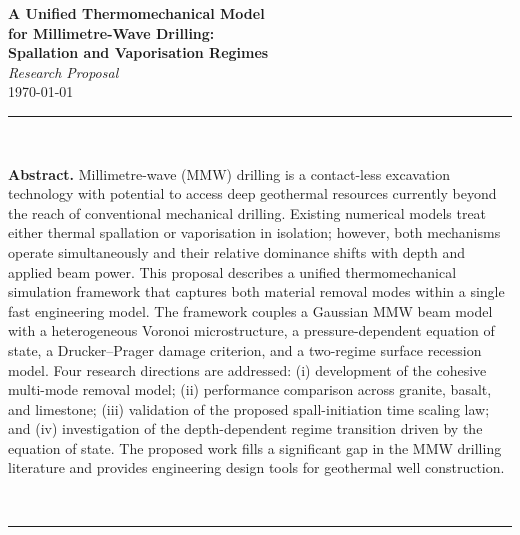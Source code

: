 \documentclass[12pt, a4paper]{article}
\begin{document}
\begin{titlepage}
\begin{center}
    \vspace*{1.5cm}
    {\Huge\bfseries\color{darkblue}
        A Unified Thermomechanical Model\\[8pt]
        for Millimetre-Wave Drilling:\\[8pt]
        Spallation and Vaporisation Regimes}\\[1.5cm]

    {\large\color{darkblue!70}\textit{Research Proposal}}\\[0.6cm]
    {\normalsize\color{black!70} \today}\\[2cm]

    \noindent\color{midblue}\rule{0.85\linewidth}{0.8pt}\\[0.4cm]
    \begin{minipage}{0.85\linewidth}
    \footnotesize\color{black!70}
    \textbf{Abstract.}
    Millimetre-wave (MMW) drilling is a contact-less excavation technology with
    potential to access deep geothermal resources currently beyond the reach of
    conventional mechanical drilling.  Existing numerical models treat either
    thermal spallation or vaporisation in isolation; however, both mechanisms
    operate simultaneously and their relative dominance shifts with depth and
    applied beam power.  This proposal describes a unified thermomechanical
    simulation framework that captures both material removal modes within a
    single fast engineering model.  The framework couples a Gaussian MMW beam
    model with a heterogeneous Voronoi microstructure, a pressure-dependent
    equation of state, a Drucker--Prager damage criterion, and a two-regime
    surface recession model.  Four research directions are addressed: (i)
    development of the cohesive multi-mode removal model; (ii) performance
    comparison across granite, basalt, and limestone; (iii) validation of the
    proposed spall-initiation time scaling law; and (iv) investigation of the
    depth-dependent regime transition driven by the equation of state.  The
    proposed work fills a significant gap in the MMW drilling literature and
    provides engineering design tools for geothermal well construction.
    \end{minipage}\\[0.4cm]
    \noindent\color{midblue}\rule{0.85\linewidth}{0.8pt}
\end{center}
\end{titlepage}
\end{document}
